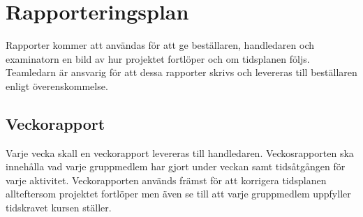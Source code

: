 \section{Rapporteringsplan}
Rapporter kommer att användas för att ge beställaren, handledaren och examinatorn en bild av hur projektet fortlöper och om tidsplanen följs. Teamledarn är ansvarig för att dessa rapporter skrivs och levereras till beställaren enligt överenskommelse.

\subsection{Veckorapport}
Varje vecka skall en veckorapport levereras till handledaren. Veckosrapporten ska innehålla vad varje gruppmedlem har gjort under veckan samt tidsåtgången för varje aktivitet. Veckorapporten används främst för att korrigera tidsplanen allteftersom projektet fortlöper men även se till att varje gruppmedlem uppfyller tidskravet kursen ställer.
